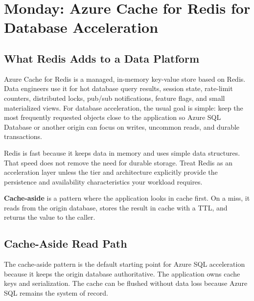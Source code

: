 \section{Monday: Azure Cache for Redis for Database Acceleration}

\subsection{What Redis Adds to a Data Platform}
Azure Cache for Redis is a managed, in-memory key-value store based on Redis. Data engineers use it for hot database query results, session state, rate-limit counters, distributed locks, pub/sub notifications, feature flags, and small materialized views. For database acceleration, the usual goal is simple: keep the most frequently requested objects close to the application so Azure SQL Database or another origin can focus on writes, uncommon reads, and durable transactions.

Redis is fast because it keeps data in memory and uses simple data structures. That speed does not remove the need for durable storage. Treat Redis as an acceleration layer unless the tier and architecture explicitly provide the persistence and availability characteristics your workload requires.

\begin{definitionbox}
\textbf{Cache-aside} is a pattern where the application looks in cache first. On a miss, it reads from the origin database, stores the result in cache with a TTL, and returns the value to the caller.
\end{definitionbox}

\subsection{Cache-Aside Read Path}
The cache-aside pattern is the default starting point for Azure SQL acceleration because it keeps the origin database authoritative. The application owns cache keys and serialization. The cache can be flushed without data loss because Azure SQL remains the system of record.

